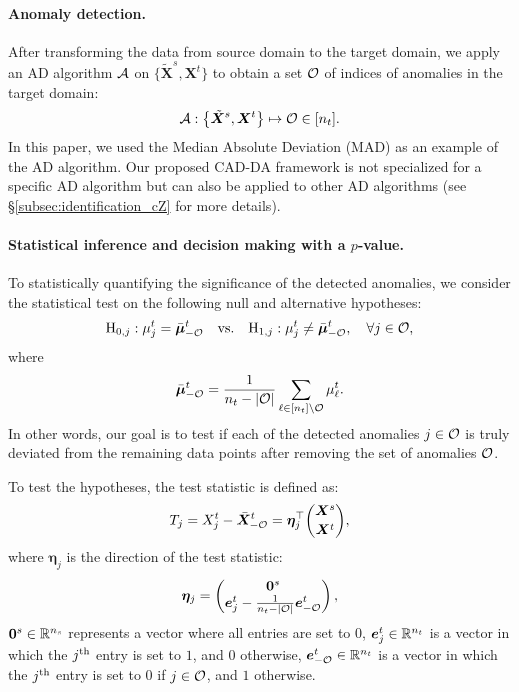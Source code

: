 \paragraph{Anomaly detection.} After transforming the data from source domain to the target domain, we apply an AD algorithm ${\mathcal A}$ on $\big \{ \tilde{\bm X}^s, \bm X^t \big \}$ to obtain a set ${\mathcal O}$ of indices of anomalies in the target domain:
%
\begin{align*}
		{\mathcal A}: \left \{ \tilde{\bm X}^s, \bm X^t \right \} 
		\mapsto
		{\mathcal O} \in [n_t].
\end{align*}
%
In this paper, we used the Median Absolute Deviation (MAD) as an example of the AD algorithm. 
%
%
Our proposed CAD-DA framework is not specialized for a specific AD algorithm but can also be applied to other AD algorithms (see \S \ref{subsec:identification_cZ} for more details).

\paragraph{Statistical inference and decision making with a $p$-value.} To statistically quantifying the significance of the detected anomalies, we consider the statistical test on the following null and alternative hypotheses:
%
\begin{align*} %
	{\rm H}_{0, j}: \mu^t_j = \bar{\bm \mu}^t_{- \cO}
	\quad
	\text{vs.}
	\quad 
	{\rm H}_{1, j}: \mu^t_j \neq \bar{\bm \mu}^t_{- \cO}, \quad 
	\forall j \in \cO,
\end{align*}
%
where 
%
\[
	\bar{\bm \mu}^t_{- {\mathcal O}} = 
	\frac{1}{n_t - |{\mathcal O}|} \sum \limits_{\ell \in [n_t] \setminus {\mathcal O}}
	\mu^t_\ell.
\]
%
In other words, our goal is to test if each of the detected anomalies $j \in {\mathcal O}$ is truly deviated from the remaining data points after removing the set of anomalies ${\mathcal O}$.

To test the hypotheses, the test statistic is defined as:
\begin{align}\label{eq:test_statistic}
	 T_j 
	 = X_j^t - \bar{\bm X}^t_{- {\mathcal O}} 
	 = \bm \eta_j^\top {\bm X^s \choose \bm X^t }, 
\end{align}
%
where $\bm \eta_j$ is the direction of the test statistic: 
%
\begin{align} \label{eq:eta_j}
\bm \eta_j = 
\begin{pmatrix}
	\bm 0^{s} \\ 
	\bm e^{t}_j - \frac{1}{n_t - |{\mathcal O}|}
	\bm e^{t}_{-{\mathcal O}}
\end{pmatrix},
\end{align}
$\bm 0^{s} \in \mathbb{R}^{n_s}$ represents a vector where all entries are set to 0, 
$\bm e^{t}_j \in \mathbb{R}^{n_t}$ is a vector in which the $j^{\rm th}$ entry is set to $1$, and $0$ otherwise,
$\bm e^{t}_{-{\mathcal O}} \in \mathbb{R}^{n_t}$ is a vector in which the $j^{\rm th}$ entry is set to $0$ if $j \in {\mathcal O}$, and $1$ otherwise.

